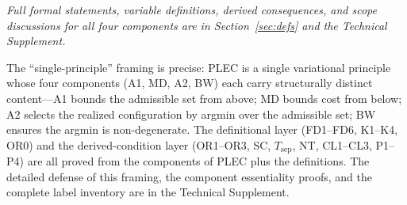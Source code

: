 \documentclass[11pt]{article}
\theoremstyle{remark}
\begin{document}
\begin{tcolorbox}[apfbox, title={The Principle of Least Enforcement Cost: four structurally necessary components}]
\medskip
\noindent\textit{Full formal statements, variable definitions, derived consequences, and scope discussions for all four components are in Section~\ref{sec:defs} and the Technical Supplement.}

\end{tcolorbox}

\smallskip\noindent The ``single-principle'' framing is precise: PLEC is a single variational principle whose four components (A1, MD, A2, BW) each carry structurally distinct content---A1 bounds the admissible set from above; MD bounds cost from below; A2 selects the realized configuration by argmin over the admissible set; BW ensures the argmin is non-degenerate.  The definitional layer (FD1--FD6, K1--K4, OR0) and the derived-condition layer (OR1--OR3, SC, $T_{\mathrm{sep}}$, NT, CL1--CL3, P1--P4) are all proved from the components of PLEC plus the definitions.  The detailed defense of this framing, the component essentiality proofs, and the complete label inventory are in the Technical Supplement.
\end{document}
